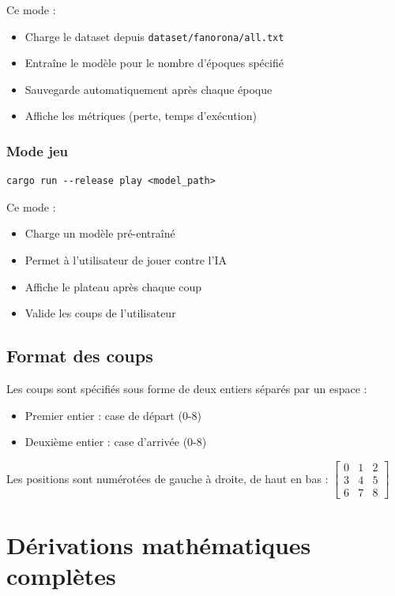 \documentclass[12pt,a4paper]{report}
\numberwithin{equation}{section}
\begin{document}
Ce mode :
\begin{itemize}
  \item Charge le dataset depuis \texttt{dataset/fanorona/all.txt}
  \item Entraîne le modèle pour le nombre d'époques spécifié
  \item Sauvegarde automatiquement après chaque époque
  \item Affiche les métriques (perte, temps d'exécution)
\end{itemize}

\subsection{Mode jeu}
\begin{verbatim}
cargo run --release play <model_path>
\end{verbatim}

Ce mode :
\begin{itemize}
  \item Charge un modèle pré-entraîné
  \item Permet à l'utilisateur de jouer contre l'IA
  \item Affiche le plateau après chaque coup
  \item Valide les coups de l'utilisateur
\end{itemize}

\section{Format des coups}

Les coups sont spécifiés sous forme de deux entiers séparés par un espace :
\begin{itemize}
  \item Premier entier : case de départ (0-8)
  \item Deuxième entier : case d'arrivée (0-8)
\end{itemize}

Les positions sont numérotées de gauche à droite, de haut en bas :
$\begin{bmatrix}
0 & 1 & 2\\
3 & 4 & 5\\
6 & 7 & 8
\end{bmatrix}$

\appendix

\chapter{Dérivations mathématiques complètes}
\end{document}
